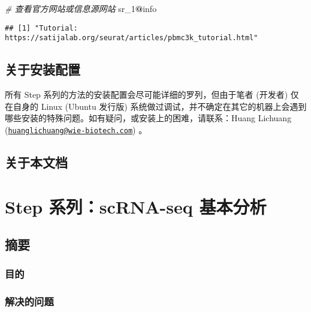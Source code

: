 \documentclass[
]{article}
\newenvironment{Shaded}{\begin{snugshade}}{\end{snugshade}}
\newcommand{\CommentTok}[1]{\textcolor[rgb]{0.56,0.35,0.01}{\textit{#1}}}
\newcommand{\DecValTok}[1]{\textcolor[rgb]{0.00,0.00,0.81}{#1}}
\newcommand{\NormalTok}[1]{#1}
\newcommand{\OperatorTok}[1]{\textcolor[rgb]{0.81,0.36,0.00}{\textbf{#1}}}
\begin{document}
\begin{Shaded}
\begin{Highlighting}[]
\CommentTok{\# 查看官方网站或信息源网站}
\NormalTok{sr\_}\DecValTok{1}\OperatorTok{@}\NormalTok{info}
\end{Highlighting}
\end{Shaded}

\begin{verbatim}
## [1] "Tutorial: https://satijalab.org/seurat/articles/pbmc3k_tutorial.html"
\end{verbatim}

\hypertarget{ux5173ux4e8eux5b89ux88c5ux914dux7f6e}{%
\subsection{关于安装配置}\label{ux5173ux4e8eux5b89ux88c5ux914dux7f6e}}

所有 Step 系列的方法的安装配置会尽可能详细的罗列，但由于笔者 (开发者) 仅在自身的 Linux (Ubuntu 发行版) 系统做过调试，并不确定在其它的机器上会遇到哪些安装的特殊问题。如有疑问，或安装上的困难，请联系：Huang Lichuang (\href{mailto:huanglichuang@wie-biotech.com}{\nolinkurl{huanglichuang@wie-biotech.com}}) 。

\hypertarget{ux5173ux4e8eux672cux6587ux6863}{%
\subsection{关于本文档}\label{ux5173ux4e8eux672cux6587ux6863}}

\hypertarget{step-ux7cfbux5217scrna-seq-ux57faux672cux5206ux6790}{%
\section{Step 系列：scRNA-seq 基本分析}\label{step-ux7cfbux5217scrna-seq-ux57faux672cux5206ux6790}}

\hypertarget{abstract}{%
\subsection{摘要}\label{abstract}}

\hypertarget{ux76eeux7684}{%
\subsubsection{目的}\label{ux76eeux7684}}

\hypertarget{ux89e3ux51b3ux7684ux95eeux9898}{%
\subsubsection{解决的问题}\label{ux89e3ux51b3ux7684ux95eeux9898}}
\end{document}
